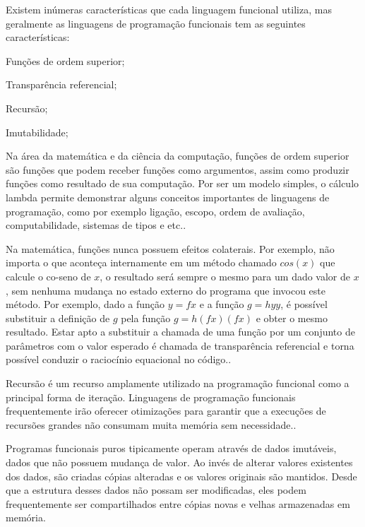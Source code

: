   Existem inúmeras características que cada linguagem funcional utiliza, mas geralmente as linguagens de programação funcionais tem as seguintes características:

  \begin{compactitem}
    \item Funções de ordem superior;
    \item Transparência referencial;
    \item Recursão;
    \item Imutabilidade;
  \end{compactitem}

  Na área da matemática e da ciência da computação, funções de ordem superior são funções que podem receber funções como argumentos, assim como produzir funções como resultado de sua computação. Por ser um modelo simples, o cálculo lambda permite demonstrar alguns conceitos importantes de linguagens de programação, como por exemplo ligação, escopo, ordem de avaliação, computabilidade, sistemas de tipos e etc.\cite{fpjava}.

  Na matemática, funções nunca possuem efeitos colaterais. Por exemplo, não importa o que aconteça internamente em um método chamado $cos(x)$ que calcule o co-seno de $x$, o resultado será sempre o mesmo para um dado valor de $x$, sem nenhuma mudança no estado externo do programa que invocou este método. Por exemplo, dado a função $y = f x$ e a função $g = h y y$, é possível substituir a definição de $g$ pela função $g = h (f x) (f x)$ e obter o mesmo resultado. Estar apto a substituir a chamada de uma função por um conjunto de parâmetros com o valor esperado é chamada de transparência referencial e torna possível conduzir o raciocínio equacional no código.\cite{Haskell:2013}.

  Recursão é um recurso amplamente utilizado na programação funcional como a principal forma de iteração. Linguagens de programação funcionais frequentemente irão oferecer otimizações para garantir que a execuções de recursões grandes não consumam muita memória sem necessidade.\cite{Haskell:2013}.

  Programas funcionais puros tipicamente operam através de dados imutáveis, dados que não possuem mudança de valor. Ao invés de alterar valores existentes dos dados, são criadas cópias alteradas e os valores originais são mantidos. Desde que a estrutura desses dados não possam ser modificadas, eles podem frequentemente ser compartilhados entre cópias novas e velhas armazenadas em memória.

